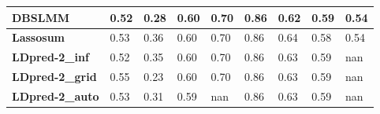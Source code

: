 \documentclass[pdflatex,sn-nature]{sn-jnl}%
\begin{document}
\begin{table}[!ht]
{\begin{tabular}{|l|l|l|l|l|l|l|l|l|}
\textbf{DBSLMM}     \cite{Yang_2020}         & \cellcolor[HTML]{FCBE7B}0.52 & \cellcolor[HTML]{D3DF82}0.28 & \cellcolor[HTML]{DFE283}0.60 & \cellcolor[HTML]{FEEB84}0.70                                                     & \cellcolor[HTML]{FEEB84}0.86                                         & \cellcolor[HTML]{FCB679}0.62                                                 & \cellcolor[HTML]{FA9F75}0.59                                                    & \cellcolor[HTML]{FEEB84}0.54 \\ \hline
\textbf{Lassosum}  \cite{Mak_2017}          & \cellcolor[HTML]{FFEB84}0.53 & \cellcolor[HTML]{87C97E}0.36 & \cellcolor[HTML]{D8E082}0.60 & \cellcolor[HTML]{FEEA83}0.70                                                     & \cellcolor[HTML]{FAEA84}0.86                                         & \cellcolor[HTML]{FFEB84}0.64                                                 & \cellcolor[HTML]{F98370}0.58                                                    & \cellcolor[HTML]{FEE983}0.54 \\ \hline
\textbf{LDpred-2\_inf}   \cite{Priv__2020}    & \cellcolor[HTML]{FDCE7E}0.52 & \cellcolor[HTML]{8ECB7E}0.35 & \cellcolor[HTML]{CDDD82}0.60 & \cellcolor[HTML]{FEDE81}0.70                                                     & \cellcolor[HTML]{FEEA83}0.86                                         & \cellcolor[HTML]{FEDF81}0.63                                                 & \cellcolor[HTML]{FEE182}0.59                                                    & nan                          \\ \hline
\textbf{LDpred-2\_grid} \cite{Priv__2020}     & \cellcolor[HTML]{CADC81}0.55 & \cellcolor[HTML]{FEE883}0.23 & \cellcolor[HTML]{DDE182}0.60 & \cellcolor[HTML]{FEE282}0.70                                                     & \cellcolor[HTML]{FEEA83}0.86                                         & \cellcolor[HTML]{FEE382}0.63                                                 & \cellcolor[HTML]{FEE983}0.59                                                    & nan                          \\ \hline
\textbf{LDpred-2\_auto}  \cite{Priv__2020}    & \cellcolor[HTML]{F4E884}0.53 & \cellcolor[HTML]{B8D780}0.31 & \cellcolor[HTML]{E8E583}0.59 & nan                                                                              & \cellcolor[HTML]{FEEA83}0.86                                         & \cellcolor[HTML]{FEE182}0.63                                                 & \cellcolor[HTML]{FFEB84}0.59                                                    & nan                          \\ \hline

\end{tabular}}
\end{table}
\end{document}

